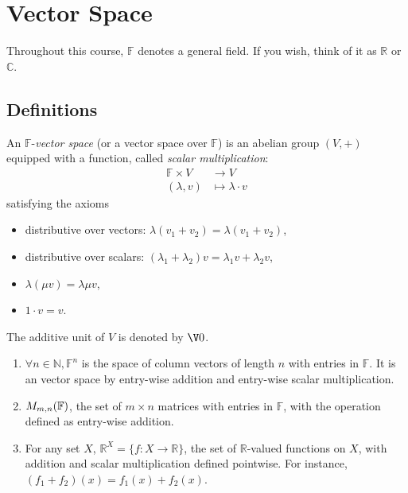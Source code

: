 \documentclass[a4paper]{article}
\newcommand*{\M}{\matrixring}
\theoremstyle{definition}
\begin{document}


\tableofcontents

\section{Vector Space}

\begin{convention}
  Throughout this course, $\mathbb{F}$ denotes a general field. If you wish, think of it as $\mathbb{R}$ or $\mathbb{C}$.
\end{convention}

\subsection{Definitions}

\begin{definition}
  An $\mathbb{F}$-\emph{vector space} (or a vector space over $\mathbb{F}$) is an abelian group $(V, +)$ equipped with a function, called \emph{scalar multiplication}:
  \begin{align*}
    \mathbb{F}\times V &\to V \\
    (\lambda, v) &\mapsto \lambda\cdot v
  \end{align*}
  satisfying the axioms
  \begin{itemize}
  \item distributive over vectors: $\lambda(v_1+v_2) = \lambda(v_1+v_2)$,
  \item distributive over scalars: $(\lambda_1+\lambda_2)v= \lambda_1 v+\lambda_2 v$,
  \item $\lambda(\mu v) = \lambda \mu v$,
  \item $1\cdot v = v$.
  \end{itemize}
\end{definition}

The additive unit of $V$ is denoted by $\V 0$.

\begin{eg}\leavevmode
  \label{eg:matrix as V}
  \begin{enumerate}
  \item $\forall n \in \mathbb{N}, \mathbb{F}^n$ is the space of column vectors of length $n$ with entries in $\mathbb{F}$. It is an vector space by entry-wise addition and entry-wise scalar multiplication.
  \item $\\M_{m,n}(\mathbb{F})$, the set of $m\times n$ matrices with entries in $\mathbb{F}$, with the operation defined as entry-wise addition.
    \item For any set $X$, $\mathbb{R}^X = \{f: X \to \mathbb{R}\}$, the set of $\mathbb{R}$-valued functions on $X$, with addition and scalar multiplication defined pointwise. For instance, $(f_1+f_2)(x) = f_1(x)+f_2(x)$.
  \end{enumerate}
\end{eg}
\end{document}
